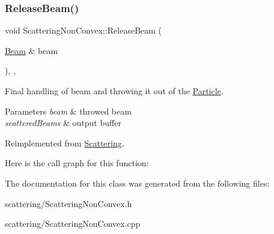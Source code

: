 \subsubsection{\texorpdfstring{Release\+Beam()}{ReleaseBeam()}}
{\footnotesize\ttfamily void Scattering\+Non\+Convex\+::\+Release\+Beam (\begin{DoxyParamCaption}\item[{\mbox{\hyperlink{class_beam}{Beam}} \&}]{beam }\end{DoxyParamCaption})\hspace{0.3cm}{\ttfamily [override]}, {\ttfamily [protected]}, {\ttfamily [virtual]}}



Final handling of beam and throwing it out of the \mbox{\hyperlink{class_particle}{Particle}}. 


\begin{DoxyParams}{Parameters}
{\em beam} & throwed beam \\
\hline
{\em scattered\+Beams} & output buffer \\
\hline
\end{DoxyParams}


Reimplemented from \mbox{\hyperlink{class_scattering_a6fa2a9f952577d5310d8a8e617f2c8f8}{Scattering}}.

Here is the call graph for this function\+:


The documentation for this class was generated from the following files\+:\begin{DoxyCompactItemize}
\item 
scattering/Scattering\+Non\+Convex.\+h\item 
scattering/Scattering\+Non\+Convex.\+cpp\end{DoxyCompactItemize}
